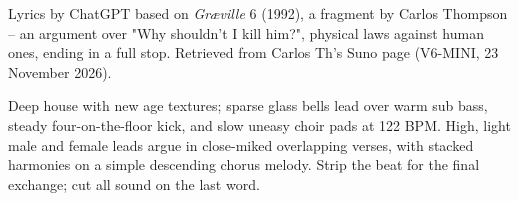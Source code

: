 
\begin{notes}
Lyrics by ChatGPT based on \emph{Gr\ae ville} 6 (1992), a fragment by Carlos Thompson -- an argument over "Why shouldn't I kill him?", physical laws against human ones, ending in a full stop. Retrieved from Carlos Th's Suno page (V6-MINI, 23 November 2026).
\end{notes}
\begin{style}
Deep house with new age textures; sparse glass bells lead over warm sub bass, steady four-on-the-floor kick, and slow uneasy choir pads at 122 BPM. High, light male and female leads argue in close-miked overlapping verses, with stacked harmonies on a simple descending chorus melody. Strip the beat for the final exchange; cut all sound on the last word.
\end{style}
